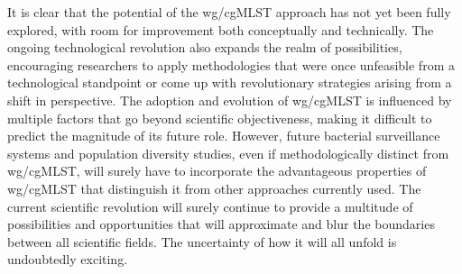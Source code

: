 It is clear that the potential of the wg/cgMLST approach has not yet been fully explored, with room for improvement both conceptually and technically. The ongoing technological revolution also expands the realm of possibilities, encouraging researchers to apply methodologies that were once unfeasible from a technological standpoint or come up with revolutionary strategies arising from a shift in perspective. The adoption and evolution of wg/cgMLST is influenced by multiple factors that go beyond scientific objectiveness, making it difficult to predict the magnitude of its future role. However, future bacterial surveillance systems and population diversity studies, even if methodologically distinct from wg/cgMLST, will surely have to incorporate the advantageous properties of wg/cgMLST that distinguish it from other approaches currently used. The current scientific revolution will surely continue to provide a multitude of possibilities and opportunities that will approximate and blur the boundaries between all scientific fields. The uncertainty of how it will all unfold is undoubtedly exciting.
